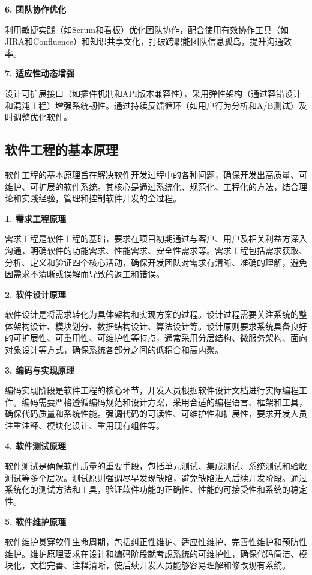 \textbf{6. 团队协作优化}

利用敏捷实践（如Scrum和看板）优化团队协作，配合使用有效协作工具（如JIRA和Confluence）和知识共享文化，打破跨职能团队信息孤岛，提升沟通效率。

\textbf{7. 适应性动态增强}

设计可扩展接口（如插件机制和API版本兼容性），采用弹性架构（通过容错设计和混沌工程）增强系统韧性。通过持续反馈循环（如用户行为分析和A/B测试）及时调整优化软件。

\subsection{软件工程的基本原理}

软件工程的基本原理旨在解决软件开发过程中的各种问题，确保开发出高质量、可维护、可扩展的软件系统。其核心是通过系统化、规范化、工程化的方法，结合理论和实践经验，管理和控制软件开发的全过程。

\textbf{1. 需求工程原理}

需求工程是软件工程的基础，要求在项目初期通过与客户、用户及相关利益方深入沟通，明确软件的功能需求、性能需求、安全性需求等。需求工程包括需求获取、分析、定义和验证四个核心活动，确保开发团队对需求有清晰、准确的理解，避免因需求不清晰或误解而导致的返工和错误。

\textbf{2. 软件设计原理}

软件设计是将需求转化为具体架构和实现方案的过程。设计过程需要关注系统的整体架构设计、模块划分、数据结构设计、算法设计等。设计原则要求系统具备良好的可扩展性、可重用性、可维护性等特点，通常采用分层结构、微服务架构、面向对象设计等方式，确保系统各部分之间的低耦合和高内聚。

\textbf{3. 编码与实现原理}

编码实现阶段是软件工程的核心环节，开发人员根据软件设计文档进行实际编程工作。编码需要严格遵循编码规范和设计方案，采用合适的编程语言、框架和工具，确保代码质量和系统性能。强调代码的可读性、可维护性和扩展性，要求开发人员注重注释、模块化设计、重用现有组件等。

\textbf{4. 软件测试原理}

软件测试是确保软件质量的重要手段，包括单元测试、集成测试、系统测试和验收测试等多个层次。测试原则强调尽早发现缺陷，避免缺陷进入后续开发阶段。通过系统化的测试方法和工具，验证软件功能的正确性、性能的可接受性和系统的稳定性。

\textbf{5. 软件维护原理}

软件维护贯穿软件生命周期，包括纠正性维护、适应性维护、完善性维护和预防性维护。维护原理要求在设计和编码阶段就考虑系统的可维护性，确保代码简洁、模块化，文档完善、注释清晰，使后续开发人员能够容易理解和修改现有系统。

